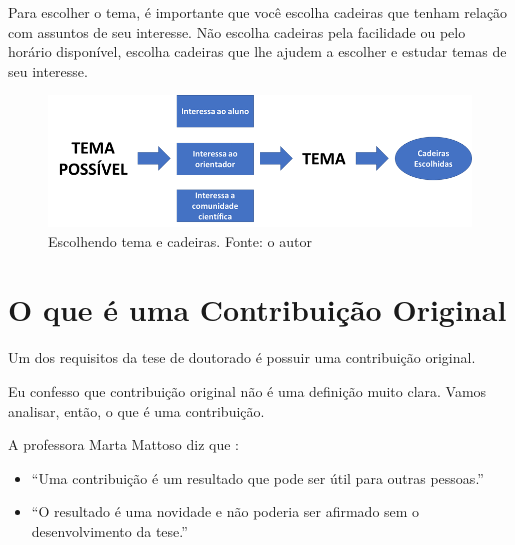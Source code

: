 Para escolher o tema, é importante que você escolha cadeiras que tenham relação com assuntos de seu interesse. Não escolha cadeiras pela facilidade ou pelo horário disponível, escolha cadeiras que lhe ajudem a escolher e estudar temas de seu interesse.

\begin{figure}[hbt]
    \centering
    \includegraphics[width=0.9\linewidth]{Images/escolhatemacadeiras}
    \caption{Escolhendo tema e cadeiras. Fonte: o autor}
    \label{fig:escolhatemacadeiras}
\end{figure}


\section{O que é uma Contribuição Original}

Um dos requisitos da tese de doutorado é possuir uma contribuição original.

Eu confesso que contribuição original não é uma definição muito clara. Vamos analisar, então, o que é uma contribuição.

A professora Marta Mattoso diz que :
\begin{itemize}
\item	“Uma contribuição é um resultado que pode ser útil para outras pessoas.”
\item	“O resultado é uma novidade e não poderia ser afirmado sem o desenvolvimento da tese.”
\end{itemize}

